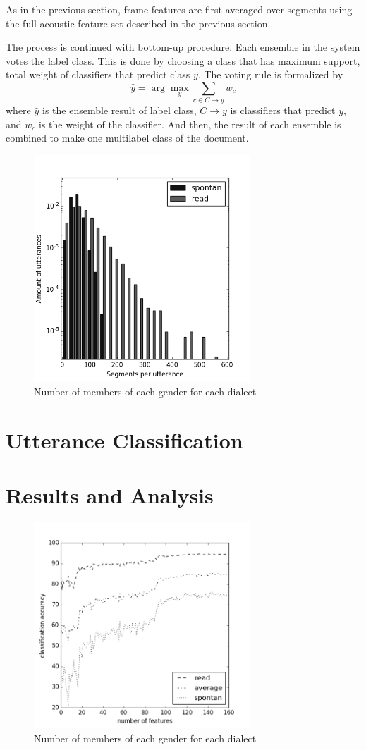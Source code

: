 \documentclass[conference]{IEEEtran}
\newcommand{\argmax}{\arg\!\max}
\begin{document}
As in the previous section, frame features are first averaged over segments using the full acoustic feature set described in the previous section.

The process is continued with bottom-up procedure.
Each ensemble in the system votes the label class.
This is done by choosing a class that has maximum support, total weight of classifiers that predict class $y$.
The voting rule is formalized by
\[\hat{y} = \argmax_y \sum_{c \in C \rightarrow y} w_c\]
where $\hat{y}$ is the ensemble result of label class, $C \rightarrow y$ is classifiers that predict $y$, and $w_c$ is the weight of the classifier.
And then, the result of each ensemble is combined to make one multilabel class of the document.

\begin{figure}[!htb]
\centering
\includegraphics[width=3.2in]{nseg_per_utt_bw}
\caption{Number of members of each gender for each dialect}
\label{demographics1}
\end{figure}

\section{Utterance Classification}


\section{Results and Analysis}

\begin{figure}[!htb]
\centering
\includegraphics[width=3.2in]{pca}
\caption{Number of members of each gender for each dialect}
\label{demographics1}
\end{figure}
\end{document}
